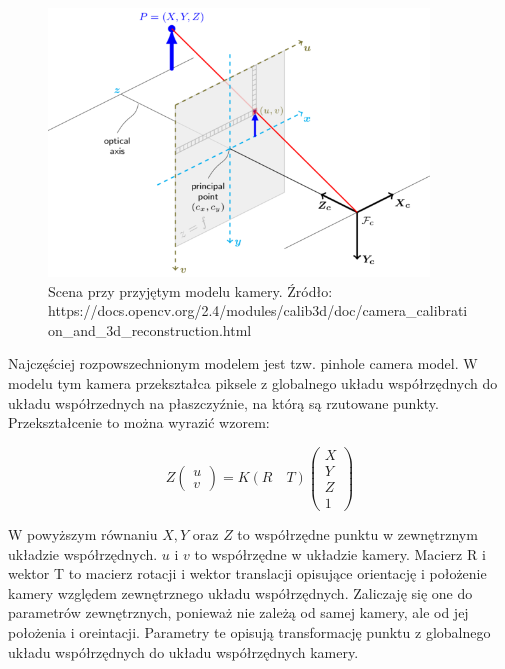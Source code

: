 \documentclass{article}
\begin{document}
\begin{figure}
\centering
	\includegraphics[width=0.90\textwidth]{pinhole_camera_model.png}\par\vspace{1cm}
\caption{Scena przy przyjętym modelu kamery. Źródło: \\ https://docs.opencv.org/2.4/modules/calib3d/doc/camera\_calibration\_and\_3d\_reconstruction.html}
	\label{fig:camera_model}
\end{figure}

Najczęściej rozpowszechnionym modelem jest tzw. pinhole camera model. W modelu tym kamera przekształca piksele z globalnego układu współrzędnych do układu współrzednych na płaszczyźnie, na którą są rzutowane punkty. Przekształcenie to można wyrazić wzorem:

\begin{equation}
	Z
	\left( \begin{array}{l}
		u \\
		v 
	\end{array} \right) 
	= K (R \quad T) 
	\left( \begin{array}{l}
		X \\	Y \\	Z \\	1
	\end{array} \right) 
\end{equation}

W powyższym równaniu $X, Y$ oraz $Z$ to współrzędne punktu w zewnętrznym układzie współrzędnych.
$u$ i $v$ to współrzędne w układzie kamery.
Macierz R i wektor T to macierz rotacji i wektor translacji opisujące orientację i położenie kamery względem zewnętrznego układu współrzędnych. Zaliczaję się one do parametrów zewnętrznych, ponieważ nie zależą od samej kamery, ale od jej położenia i oreintacji. Parametry te opisują transformację punktu z globalnego układu współrzędnych do układu współrzędnych kamery. 
\end{document}
